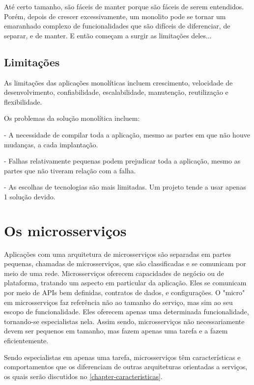 Até certo tamanho, são fáceis de manter porque são fáceis de serem entendidos. Porém, depois de crescer excessivamente, um monolito pode se tornar um emaranhado complexo de funcionalidades que são difíceis de diferenciar, de separar, e de manter. E então começam a surgir as limitações deles...

\subsection{Limitações}\label{subsection-monolitos-limitacoes}

As limitações das aplicações monolíticas incluem crescimento, velocidade de desenvolvimento, confiabilidade, escalabilidade, manutenção, reutilização e flexibilidade.

Os problemas da solução monolítica incluem:

- A necessidade de compilar toda a aplicação, mesmo as partes em que não houve mudanças, a cada implantação.

- Falhas relativamente pequenas podem prejudicar toda a aplicação, mesmo as partes que não tiveram relação com a falha.

- As escolhas de tecnologias são mais limitadas. Um projeto tende a usar apenas 1 solução devido.

\section{Os microsserviços}

Aplicações com uma arquitetura de microsserviços são separadas em partes pequenas, chamadas de microsserviços, que são classificadas e se comunicam por meio de uma rede. Microsserviços oferecem capacidades de negócio ou de plataforma, tratando um aspecto em particular da aplicação. Eles se comunicam por meio de APIs bem definidas, contratos de dados, e configurações. O "micro" em microsserviços faz referência não ao tamanho do serviço, mas sim ao seu escopo de funcionalidade. Eles oferecem apenas uma determinada funcionalidade, tornando-se especialistas nela. Assim sendo, microsserviços não necessariamente devem ser pequenos em tamanho, mas fazem apenas uma tarefa e a fazem eficientemente. 
 
Sendo especialistas em apenas uma tarefa, microsserviços têm características e comportamentos que os diferenciam de outras arquiteturas orientadas a serviços, os quais serão discutidos no \autoref{chapter-caracteristicas}.


